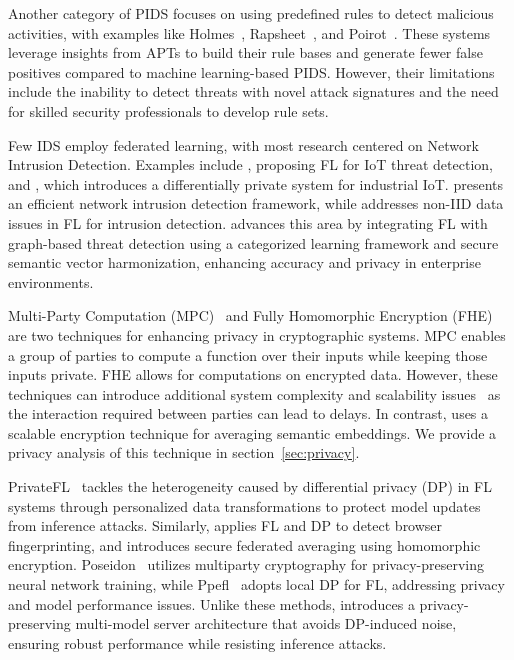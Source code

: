  Another category of PIDS focuses on using predefined rules to detect malicious activities, with examples like Holmes~\cite{holmes2019}, Rapsheet~\cite{rapsheet2020}, and Poirot~\cite{poirot2019}. These systems leverage insights from APTs to build their rule bases and generate fewer false positives compared to machine learning-based PIDS. However, their limitations include the inability to detect threats with novel attack signatures and the need for skilled security professionals to develop rule sets.

 Few IDS employ federated learning, with most research centered on Network Intrusion Detection. Examples include \cite{man2021intelligent}, proposing FL for IoT threat detection, and \cite{friha20232df}, which introduces a differentially private system for industrial IoT. \cite{li2023efficient} presents an efficient network intrusion detection framework, while \cite{guo2023new} addresses non-IID data issues in FL for intrusion detection. \Sys advances this area by integrating FL with graph-based threat detection using a categorized \gnnshort learning framework and secure semantic vector harmonization, enhancing accuracy and privacy in enterprise environments.

 Multi-Party Computation (MPC)~\cite{cramer2015secure} and Fully Homomorphic Encryption (FHE) \cite{armknecht2015guide} are two techniques for enhancing privacy in cryptographic systems. MPC enables a group of parties to compute a function over their inputs while keeping those inputs private. FHE allows for computations on encrypted data. However, these techniques can introduce additional system complexity and scalability issues~\cite{du2001secure,gentry2009fully,asharov2013more} as the interaction required between parties can lead to delays. In contrast, \Sys uses a scalable encryption technique for averaging semantic embeddings. We provide a privacy analysis of this technique in section~\ref{sec:privacy}.

 PrivateFL~\cite{yang2023privatefl} tackles the heterogeneity caused by differential privacy (DP) in FL systems through personalized data transformations to protect model updates from inference attacks. Similarly, \cite{annamalai2023fp} applies FL and DP to detect browser fingerprinting, and \cite{dasu2022prov} introduces secure federated averaging using homomorphic encryption. Poseidon~\cite{sav2020poseidon} utilizes multiparty cryptography for privacy-preserving neural network training, while Ppefl~\cite{wang2023ppefl} adopts local DP for FL, addressing privacy and model performance issues. Unlike these methods, \Sys introduces a privacy-preserving multi-model server architecture that avoids DP-induced noise, ensuring robust performance while resisting inference attacks.
 
